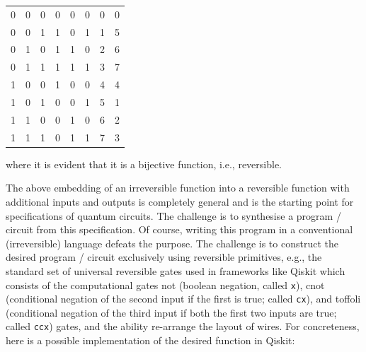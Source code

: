 \begin{center}\begin{tabular}{|ccc|ccc|@{\qquad\qquad}|c|c|}
0 & 0 & 0 &     0 & 0 & 0     & 0 & 0 \\
0 & 0 & 1 &     1 & 0 & 1     & 1 & 5 \\
0 & 1 & 0 &     1 & 1 & 0    & 2 & 6 \\
0 & 1 & 1 &     1 & 1 & 1    & 3 & 7 \\
1 & 0 & 0 &     1 & 0 & 0    & 4 & 4 \\
1 & 0 & 1 &     0 & 0 & 1    & 5 & 1 \\
1 & 1 & 0 &     0 & 1 & 0    & 6 & 2 \\
1 & 1 & 1 &     0 & 1 & 1    & 7 & 3
\end{tabular}\end{center}

\noindent where it is evident that it is a bijective function, i.e., reversible.

The above embedding of an irreversible function into a reversible function with additional inputs and outputs is
completely general and is the starting point for specifications of quantum circuits. The challenge is to synthesise a
program / circuit from this specification. Of course, writing this program in a conventional (irreversible) language
defeats the purpose. The challenge is to construct the desired program / circuit exclusively using reversible
primitives, e.g., the standard set of universal reversible gates used in frameworks like Qiskit which consists of the
computational gates \textsf{not} (boolean negation, called \verb|x|), \textsf{cnot} (conditional negation of the second
input if the first is true; called \verb|cx|), and \textsf{toffoli} (conditional negation of the third input if both the
first two inputs are true; called \verb|ccx|) gates, and the ability re-arrange the layout of wires. For concreteness,
here is a possible implementation of the desired function in Qiskit:

